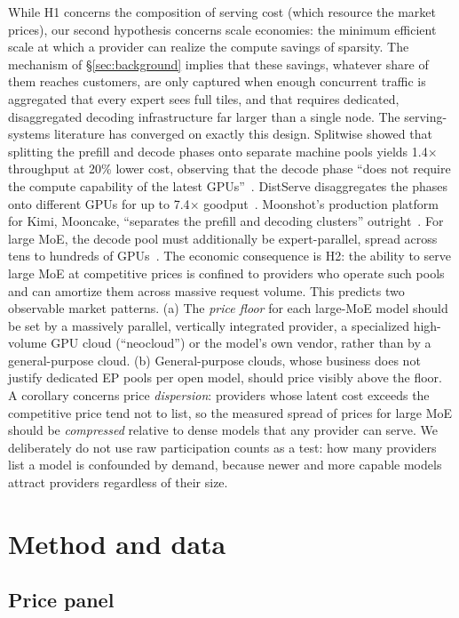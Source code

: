 \documentclass[11pt]{article}
\begin{document}
While H1 concerns the composition of serving cost (which resource the market
prices), our second hypothesis concerns scale economies: the minimum efficient
scale at which a provider can realize the compute savings of sparsity. The
mechanism of \S\ref{sec:background} implies that these savings, whatever share
of them reaches customers, are only captured when enough concurrent traffic is
aggregated that every expert sees full tiles, and that requires dedicated,
disaggregated decoding infrastructure far larger than a single node. The serving-systems literature
has converged on exactly this design. Splitwise showed that splitting the prefill
and decode phases onto separate machine pools yields 1.4$\times$ throughput at
20\% lower cost, observing that the decode phase ``does not require the compute capability of the latest GPUs''~\cite{r33}. DistServe disaggregates the phases onto different GPUs for up to 7.4$\times$ goodput~\cite{r34}. Moonshot's production platform for Kimi, Mooncake, ``separates the prefill and decoding clusters'' outright~\cite{r35}. For large MoE, the decode pool must
additionally be expert-parallel, spread across tens to hundreds of
GPUs~\cite{r8,r10,r11}. The economic consequence is H2: the
ability to serve large MoE at competitive prices is confined to providers who
operate such pools and can amortize them across massive request volume. This
predicts two observable market patterns. (a) The \emph{price floor} for
each large-MoE model should be set by a massively parallel, vertically
integrated provider, a specialized high-volume GPU cloud (``neocloud'') or
the model's own vendor, rather than by a general-purpose cloud. (b)
General-purpose clouds, whose business does not justify dedicated EP pools
per open model, should price visibly above the floor. A corollary concerns
price \emph{dispersion}: providers whose latent cost exceeds the
competitive price tend not to list, so the measured spread of prices for
large MoE should be \emph{compressed} relative to dense models that any
provider can serve. We deliberately do not use raw participation counts as
a test: how many providers list a model is confounded by demand, because
newer and more capable models attract providers regardless of their size.

\section{Method and data}

\subsection{Price panel}
\end{document}
